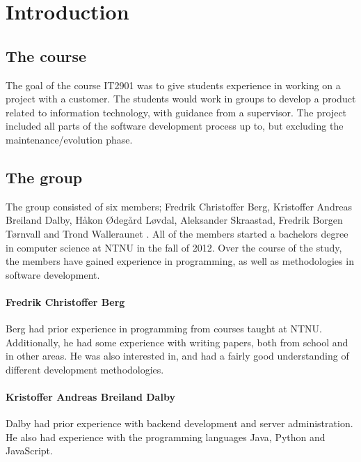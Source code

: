 
\chapter{Introduction}
\label{ch:introduction}

\section{The course}
\label{sec:introduction-the_course}

The goal of the course IT2901 was to give students experience in working on a project with a customer. The students would work in groups to develop a product related to information technology, with guidance from a supervisor. The project included all parts of the software development process up to, but excluding the maintenance/evolution phase.

\section{The group}
\label{sec:introduction-the_group}

The group consisted of six members; Fredrik Christoffer Berg, Kristoffer Andreas Breiland Dalby, Håkon Ødegård Løvdal, Aleksander Skraastad, Fredrik Borgen Tørnvall and Trond Walleraunet . All of the members started a bachelors degree in computer science at NTNU in the fall of 2012. Over the course of the study, the members have gained experience in programming, as well as methodologies in software development.

\subsubsection{Fredrik Christoffer Berg}

Berg had prior experience in programming from courses taught at NTNU. Additionally, he had some experience with writing papers, both from school and in other areas. He was also interested in, and had a fairly good understanding of different development methodologies.

\subsubsection{Kristoffer Andreas Breiland Dalby}

Dalby had prior experience with backend development and server administration. He also had experience with the programming languages Java, Python and JavaScript.

